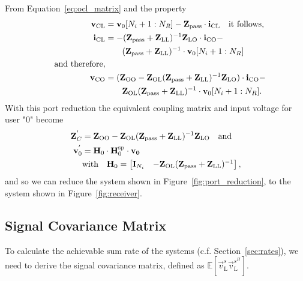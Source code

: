From Equation~\eqref{eq:ocl_matrix} and the property
\begin{align}
\mathbf{v}_\text{CL} &= \mathbf{v}_0[N_i+1:N_R]-\mathbf{Z}_{\text{pass}}\cdot\mathbf{i}_\text{CL}\quad\text{it follows,}\\
\mathbf{i}_\text{CL} &= -(\mathbf{Z}_{\text{pass}} + \mathbf{Z}_\text{LL})^{-1}\mathbf{Z}_\text{LO}\cdot\mathbf{i}_\text{CO} -\\\nonumber
&\qquad (\mathbf{Z}_{\text{pass}} + \mathbf{Z}_\text{LL})^{-1}\cdot\mathbf{v}_{0}[N_i+1:N_R]\\\nonumber\quad\text{and therefore,}&\\
\mathbf{v}_\text{CO} &= (\mathbf{Z}_\text{OO}-\mathbf{Z}_\text{OL}(\mathbf{Z}_{\text{pass}} + \mathbf{Z}_\text{LL})^{-1}\mathbf{Z}_\text{LO})\cdot\mathbf{i}_\text{CO} -\\\nonumber&\qquad \mathbf{Z}_\text{OL}(\mathbf{Z}_{\text{pass}} + \mathbf{Z}_\text{LL})^{-1}\cdot\mathbf{v}_0[N_i+1:N_R].
\end{align}
With this port reduction the equivalent coupling matrix and input voltage for user "0" become
\begin{align}
\label{eq:port_reduction}
\mathbf{Z}_C^{'}&= \mathbf{Z}_\text{OO} - \mathbf{Z}_\text{OL}(\mathbf{Z}_{\text{pass}} + \mathbf{Z}_\text{LL})^{-1}\mathbf{Z}_\text{LO}\quad\text{and}\\
\mathbf{v}_0^{'} &= \mathbf{H}_0 \cdot\mathbf{H}_{0}^{\text{sp}}\cdot \mathbf{v_0}\\\nonumber
&\text{with}\quad\mathbf{H}_0=
\begin{bmatrix}
\mathbf{I}_{N_i} & -\mathbf{Z}_\text{OL}(\mathbf{Z}_{\text{pass}} + \mathbf{Z}_\text{LL})^{-1}
\end{bmatrix},
\end{align}
and so we can reduce the system shown in Figure~\ref{fig:port_reduction}, to the system shown in Figure~\ref{fig:receiver}.

\subsection{Signal Covariance Matrix}
\label{sec:sig_cov}
To calculate the achievable sum rate of the systems (c.f. Section~\ref{sec:rates}), we need to derive the signal covariance matrix, defined as $\mathbb{E}[\vec{v}_\text{L}^s\vec{v}_\text{L}^{s^H}]$.

